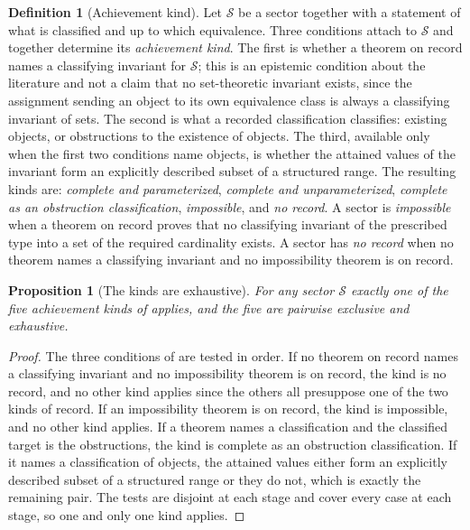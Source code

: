 \documentclass[11pt,letterpaper]{article}
\newtheorem{proposition}[theorem]{Proposition}
\theoremstyle{definition}
\newtheorem{definition}[theorem]{Definition}
\theoremstyle{remark}
\begin{document}
\begin{definition}[Achievement kind]
\label{def:kinds}
Let $\mathcal{S}$ be a sector together with a statement of what is classified and up to which equivalence. Three conditions attach to $\mathcal{S}$ and together determine its \emph{achievement kind}. The first is whether a theorem on record names a classifying invariant for $\mathcal{S}$; this is an epistemic condition about the literature and not a claim that no set-theoretic invariant exists, since the assignment sending an object to its own equivalence class is always a classifying invariant of sets. The second is what a recorded classification classifies: existing objects, or obstructions to the existence of objects. The third, available only when the first two conditions name objects, is whether the attained values of the invariant form an explicitly described subset of a structured range. The resulting kinds are: \emph{complete and parameterized}, \emph{complete and unparameterized}, \emph{complete as an obstruction classification}, \emph{impossible}, and \emph{no record}. A sector is \emph{impossible} when a theorem on record proves that no classifying invariant of the prescribed type into a set of the required cardinality exists. A sector has \emph{no record} when no theorem names a classifying invariant and no impossibility theorem is on record.
\end{definition}

\begin{proposition}[The kinds are exhaustive]
\label{prop:kinds}
For any sector $\mathcal{S}$ exactly one of the five achievement kinds of  applies, and the five are pairwise exclusive and exhaustive.
\end{proposition}

\begin{proof}
The three conditions of  are tested in order. If no theorem on record names a classifying invariant and no impossibility theorem is on record, the kind is no record, and no other kind applies since the others all presuppose one of the two kinds of record. If an impossibility theorem is on record, the kind is impossible, and no other kind applies. If a theorem names a classification and the classified target is the obstructions, the kind is complete as an obstruction classification. If it names a classification of objects, the attained values either form an explicitly described subset of a structured range or they do not, which is exactly the remaining pair. The tests are disjoint at each stage and cover every case at each stage, so one and only one kind applies.
\end{proof}
\end{document}
